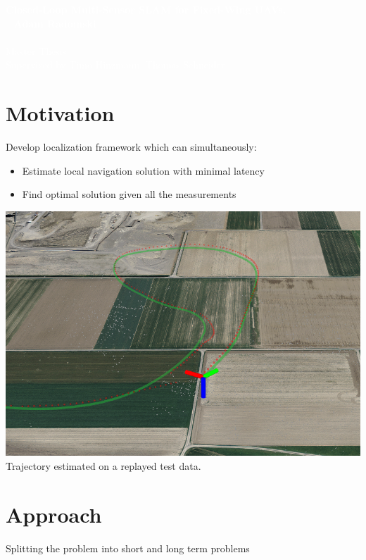 \documentclass[%
    fourtothree=true, %
    DepLogo=true     %
    ]{ETHpres}
\newcommand*{\ETHtitle}{Closed-Loop Multi-Sensor SLAM for Fixed-Wing UAVs.}
\newcommand*{\ETHauthor}{Adam Radomski}
\begin{document}
\ETHtitelbild\textcolor{white}{\large\textbf{\ETHtitle}}\\~\newline\hspace{6mm}\normalsize%
\textcolor{white}{
\textbf{\ETHauthor}\\ \\
Master Thesis\\
Supervised by Timo Hinzmann, Thomas Schneider}\\


\ETHslide
\section*{Motivation}
Develop localization framework which can simultaneously:
\begin{itemize}
	\item[\ETHitem] Estimate local navigation solution with minimal latency
	\item[\ETHitem] Find optimal solution given all the measurements
\end{itemize}
\begin{center}
\includegraphics[width=0.6\textheight]{pictures/simulation.png}\\
\tiny Trajectory estimated on a replayed test data.
\end{center}

\clearpage

\ETHslide
\section*{Approach}
Splitting the problem into short and long term problems
\end{document}
